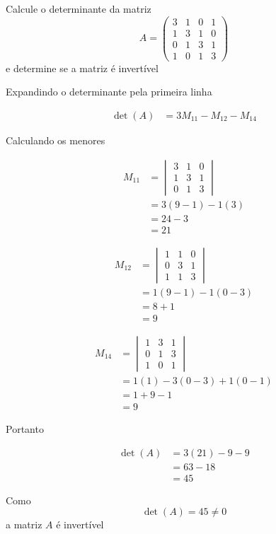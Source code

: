 \documentclass[a4paper,12pt,fleqn]{article}
\begin{document}
Calcule o determinante da matriz
\[
  A =
  \begin{pmatrix}
    3 & 1 & 0 & 1 \\
    1 & 3 & 1 & 0 \\
    0 & 1 & 3 & 1 \\
    1 & 0 & 1 & 3
  \end{pmatrix}
\]
e determine se a matriz é invertível

\begin{answer}
  Expandindo o determinante pela primeira linha

  \begin{align*}
    \det(A)
    & = 3M_{11} - M_{12} - M_{14}
  \end{align*}

  Calculando os menores

  \begin{align*}
    M_{11}
    & = \begin{vmatrix}
          3 & 1 & 0 \\
          1 & 3 & 1 \\
          0 & 1 & 3
        \end{vmatrix}
    \\
    & = 3(9-1) - 1(3)
    \\
    & = 24-3
    \\
    & = 21
  \end{align*}

  \begin{align*}
    M_{12}
    & = \begin{vmatrix}
          1 & 1 & 0 \\
          0 & 3 & 1 \\
          1 & 1 & 3
        \end{vmatrix}
    \\
    & = 1(9-1) - 1(0-3)
    \\
    & = 8+1
    \\
    & = 9
  \end{align*}

  \begin{align*}
    M_{14}
    & = \begin{vmatrix}
          1 & 3 & 1 \\
          0 & 1 & 3 \\
          1 & 0 & 1
        \end{vmatrix}
    \\
    & = 1(1) - 3(0-3) + 1(0-1)
    \\
    & = 1+9-1
    \\
    & = 9
  \end{align*}

  Portanto

  \begin{align*}
    \det(A)
    & = 3(21)-9-9
    \\
    & = 63-18
    \\
    & = 45
  \end{align*}

  Como
  \[
    \det(A) = 45 \neq 0
  \]
  a matriz $A$ é invertível
\end{answer}
\end{document}
